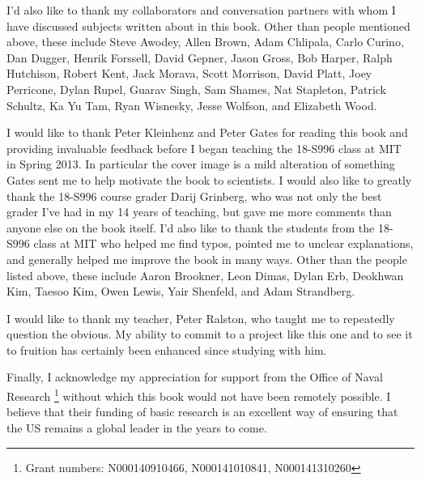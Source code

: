 I'd also like to thank my collaborators and conversation partners with whom I have discussed subjects written about in this book. Other than people mentioned above, these include Steve Awodey, Allen Brown, Adam Chlipala, Carlo Curino, Dan Dugger, Henrik Forssell, David Gepner, Jason Gross, Bob Harper, Ralph Hutchison, Robert Kent, Jack Morava, Scott Morrison, David Platt, Joey Perricone, Dylan Rupel, Guarav Singh, Sam Shames, Nat Stapleton, Patrick Schultz, Ka Yu Tam, Ryan Wisnesky, Jesse Wolfson, and Elizabeth Wood.

I would like to thank Peter Kleinhenz and Peter Gates for reading this book and providing invaluable feedback before I began teaching the 18-S996 class at MIT in Spring 2013. In particular the cover image is a mild alteration of something Gates sent me to help motivate the book to scientists. I would also like to greatly thank the 18-S996 course grader Darij Grinberg, who was not only the best grader I've had in my 14 years of teaching, but gave me more comments than anyone else on the book itself. I'd also like to thank the students from the 18-S996 class at MIT who helped me find typos, pointed me to unclear explanations, and generally helped me improve the book in many ways. Other than the people listed above, these include Aaron Brookner, Leon Dimas, Dylan Erb, Deokhwan Kim, Taesoo Kim, Owen Lewis, Yair Shenfeld, and Adam Strandberg.

I would like to thank my teacher, Peter Ralston, who taught me to repeatedly question the obvious. My ability to commit to a project like this one and to see it to fruition has certainly been enhanced since studying with him.

Finally, I acknowledge my appreciation for support from the Office of Naval Research
\footnote{Grant numbers: N000140910466, N000141010841, N000141310260} 
without which this book would not have been remotely possible. I believe that their funding of basic research is an excellent way of ensuring that the US remains a global leader in the years to come.


